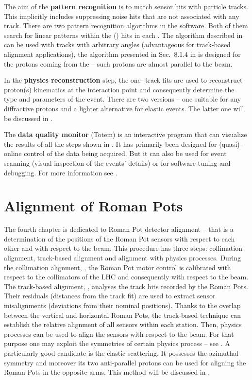 \> The aim of the {\bf pattern recognition} is to match sensor hits with particle tracks. This implicitly includes suppressing noise hits that are not associated with any track. There are two pattern recognition algorithms in the  software. Both of them search for linear patterns within the () hits in each . The algorithm described in  can be used with tracks with arbitrary angles (advantageous for track-based alignment applications), the algorithm presented in Sec.~8.1.4 in  is designed for the protons coming from the  -- such protons are almost parallel to the beam.

\> In the {\bf physics reconstruction} step, the one- track fits are used to reconstruct proton(s) kinematics at the interaction point and consequently determine the type and parameters of the event. There are two versions -- one suitable for any diffractive protons and a lighter alternative for elastic events. The latter one will be discussed in .



\> The {\bf data quality monitor} (Totem) is an interactive program that can visualize the results of all the steps shown in . It has primarily been designed for (quasi)-online control of the data being acquired. But it can also be used for event scanning (visual inspection of the events' details) or for software tuning and debugging. For more information see .

\chapter[al]{Alignment of Roman Pots}

The fourth chapter is dedicated to Roman Pot detector alignment -- that is a determination of the positions of the Roman Pot sensors with respect to each other and with respect to the beam. This procedure has three steps: collimation alignment, track-based alignment and alignment with physics processes. During the collimation alignment, , the Roman Pot motor control is calibrated with respect to the collimators of the LHC and consequently with respect to the beam. The track-based alignment, , analyses the track hits recorded by the Roman Pots. Their residuals (distances from the track fit) are used to extract sensor misalignments (deviations from their nominal positions). Thanks to the overlap between the vertical and horizontal Roman Pots, the track-based technique can establish the relative alignment of all sensors within each station. Then, physics processes can be used to align the sensors with respect to the beam. For that purpose one may exploit the symmetries of certain physics process -- see . A particularly good candidate is the elastic scattering. It possesses the azimuthal symmetry and moreover its two anti-parallel protons can be used for aligning the Roman Pots in the opposite arms. This method will be discussed in .

